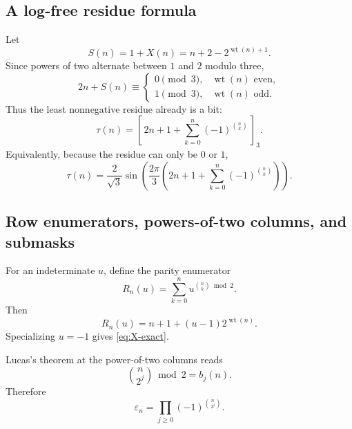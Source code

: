 \documentclass[11pt,oneside]{article}
\numberwithin{equation}{section}
\theoremstyle{definition}
\theoremstyle{remark}
\newcommand{\wt}{\operatorname{wt}}
\newcommand{\eps}{\varepsilon}
\newcommand{\TM}{\tau}
\newcommand{\resmod}[2]{[\,#1\,]_{#2}}
\begin{document}
\subsection{A log-free residue formula}

Let
\begin{equation}
 S(n)=1+X(n)=n+2-2^{\wt(n)+1}.
 \label{eq:S-row}
\end{equation}
Since powers of two alternate between \(1\) and \(2\) modulo three,
\begin{equation}
 2n+S(n)\equiv
 \begin{cases}0\pmod3,&\wt(n)\text{ even},\\
               1\pmod3,&\wt(n)\text{ odd}.
 \end{cases}
\end{equation}
Thus the least nonnegative residue already is a bit:
\begin{equation}
 \boxed{\TM(n)=\resmod{2n+1+\sum_{k=0}^n(-1)^{\binom nk}}{3}.}
 \label{eq:log-free-mod3}
\end{equation}
Equivalently, because the residue can only be \(0\) or \(1\),
\begin{equation}
 \TM(n)=\frac2{\sqrt3}
 \sin\!\left(\frac{2\pi}{3}\left(2n+1+
 \sum_{k=0}^n(-1)^{\binom nk}\right)\right).
 \label{eq:log-free-sine}
\end{equation}

\subsection{Row enumerators, powers-of-two columns, and submasks}

For an indeterminate \(u\), define the parity enumerator
\[
 R_n(u)=\sum_{k=0}^n u^{\binom nk\bmod2}.
\]
Then
\begin{equation}
 \boxed{R_n(u)=n+1+(u-1)2^{\wt(n)}.}
 \label{eq:row-enumerator}
\end{equation}
Specializing \(u=-1\) gives \eqref{eq:X-exact}.

Lucas's theorem at the power-of-two columns reads
\begin{equation}
 \binom{n}{2^j}\bmod2=b_j(n).
 \label{eq:power-two-column}
\end{equation}
Therefore
\begin{equation}
 \boxed{\eps_n=\prod_{j\ge0}(-1)^{\binom{n}{2^j}}.}
 \label{eq:power-two-column-product}
\end{equation}
\end{document}

